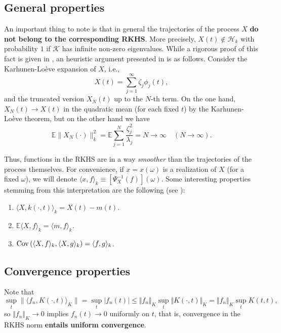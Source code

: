 \subsection*{General properties}

An important thing to note is that in general the trajectories of the process \(X\) \textbf{do not belong to the corresponding RKHS}. More precisely, \(X(t)\notin \mathcal H_k\) with probability \(1\) if \(\mathcal K\) has infinite non-zero eigenvalues. While a rigorous proof of this fact is given in , an heuristic argument presented in  is as follows. Consider the Karhunen-Loève expansion of \(X\), i.e.,
\[
  X(t) = \sum_{j=1}^\infty \zeta_j \phi_j(t),
\]
and the truncated version \(X_N(t)\) up to the \(N\)-th term. On the one hand, \(X_N(t)\to X(t)\) in the quadratic mean (for each fixed \(t\)) by the Karhunen-Loève theorem, but on the other hand we have
\[
  \mathds E\|X_N(\cdot)\|^2_k = \mathds E \sum_{j=1}^N \frac{\zeta_j^2}{\lambda_j} = N \to \infty \quad (N\to\infty).
\]

Thus, functions in the RKHS are in a way \textit{smoother} than the trajectories of the process themselves. For convenience, if \(x=x(\omega)\) is a realization of \(X\) (for a fixed \(\omega\)), we will denote \(\langle x, f\rangle_k \equiv \left[\Psi_X^{-1}(f)\right](\omega)\). Some interesting properties stemming from this interpretation are the following (see ):

\begin{enumerate}

  \item \(\langle X, k(\cdot, t)\rangle_k = X(t) - m(t)\).

  \item \(\mathds{E} \langle X, f\rangle_k = \langle m, f\rangle_k\).

  \item \(\operatorname{Cov} \left(\langle X, f \rangle_k , \langle X, g\rangle_k\right) = \langle f, g\rangle_k\).

\end{enumerate}

\subsection*{Convergence properties}

Note that
\[
		\sup_t \|\langle f_n,K(\cdot,t)\rangle_K\|=\sup_t|f_n(t)|\leq \Vert f_n\Vert_K \sup_t\Vert K(\cdot,t)\Vert_K
		=\Vert f_n\Vert_K \sup_t K(t,t),
\]
		so $\Vert f_n\Vert_K \to 0$ implies $f_n(t)\to 0$ uniformly on $t$, that is, convergence in the RKHS norm \textbf{entails uniform convergence}.
